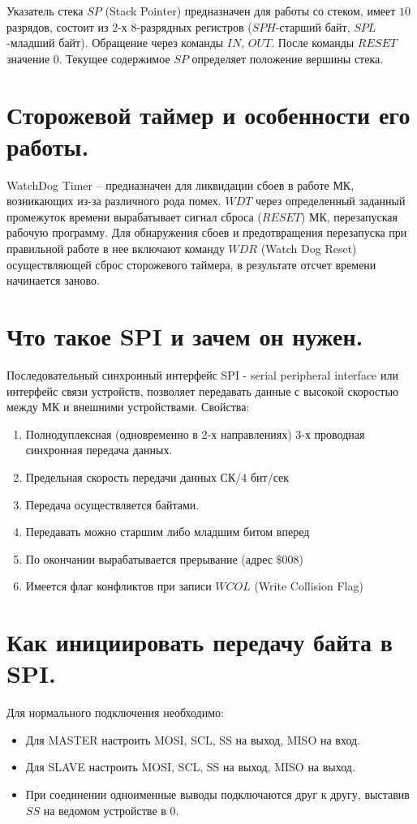 Указатель стека $SP$ (Stack Pointer) предназначен для работы со стеком, имеет $10$ разрядов, 
состоит из $2$-х $8$-разрядных регистров ($SPH$-старший байт, $SPL$-младший байт). Обращение 
через команды $IN$, $OUT$. После команды $RESET$ значение $0$. 
Текущее содержимое $SP$ определяет положение вершины стека. 

\section{Сторожевой таймер и особенности его работы.}

WatchDog Timer – предназначен для ликвидации сбоев в работе МК, возникающих из-за различного
рода помех. $WDT$ через определенный заданный промежуток времени вырабатывает сигнал сброса 
($RESET$) МК, перезапуская рабочую программу. Для обнаружения сбоев и предотвращения 
перезапуска при правильной работе в нее включают команду $WDR$ (Watch Dog Reset) 
осуществляющей сброс сторожевого таймера, в результате отсчет времени начинается заново.

\section{Что такое SPI и зачем он нужен.}

Последовательный синхронный интерфейс SPI - serial peripheral interface или интерфейс связи
устройств, позволяет передавать данные с высокой скоростью между МК и внешними устройствами.
Свойства:
\begin{enumerate}
  \item Полнодуплексная (одновременно в $2$-х направлениях) $3$-х проводная синхронная
        передача данных. 
  \item Предельная скорость передачи данных СК/$4$ бит/сек 
  \item Передача осуществляется байтами.
  \item Передавать можно старшим либо младшим битом вперед  
  \item По окончании вырабатывается прерывание (адрес $\$008$) 
  \item Имеется флаг конфликтов при записи $WCOL$ (Write Collision Flag) 
\end{enumerate}	

\section{Как инициировать передачу байта в SPI.}

Для нормального подключения необходимо:
\begin{itemize}
  \item Для MASTER настроить MOSI, SCL, SS на выход, MISO на вход.
  \item Для SLAVE настроить MOSI, SCL, SS на выход, MISO на выход.
  \item При соединении одноименные выводы подключаются друг к другу, выставив $SS$ на ведомом 
        устройстве в $0$. 
\end{itemize}

